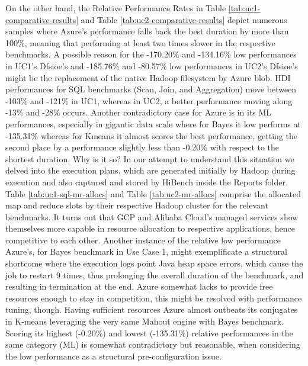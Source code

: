 \documentclass[review]{elsarticle}
\begin{document}
On the other hand, the Relative Performance Rates in Table \ref{tab:uc1-comparative-results} and Table \ref{tab:uc2-comparative-results} depict numerous samples where Azure's performance falls back the best duration by more than 100\%, meaning that performing at least two times slower in the respective benchmarks. A possible reason for the -170.20\% and -134.16\% low performances in UC1's Dfsioe's and -185.76\% and -80.57\% low performances in UC2's Dfsioe's might be the replacement of the native Hadoop filesystem by Azure blob. HDI performances for SQL benchmarks (Scan, Join, and Aggregation) move between -103\% and -121\% in UC1, whereas in UC2, a better performance moving along -13\% and -28\% occurs. Another contradictory case for Azure is in its ML performances, especially in gigantic data scale where for Bayes it low performs at -135.31\% whereas for Kmeans it almost scores the best performance, getting the second place by a performance slightly less than -0.20\% with respect to the shortest duration. Why is it so? In our attempt to understand this situation we delved into the execution plans, which are generated initially by Hadoop during execution and also captured and stored by HiBench inside the Reports folder. Table \ref{tab:uc1-sql-mr-allocs} and Table \ref{tab:uc2-mr-allocs} comprise the allocated map and reduce slots by their respective Hadoop cluster for the relevant benchmarks. It turns out that GCP and Alibaba Cloud's managed services show themselves more capable in resource allocation to respective applications, hence competitive to each other. Another instance of the relative low performance Azure's, for Bayes benchmark in Use Case 1, might exemplificate a structural shortcome where the execution logs point Java heap space errors, which cause the job to restart 9 times, thus prolonging the overall duration of the benchmark, and resulting in termination at the end. Azure somewhat lacks to provide free resources enough to stay in competition, this might be resolved with performance tuning, though. Having sufficient resources Azure almost outbeats its conjugates in K-means leveraging the very same Mahout engine with Bayes benchmark. Scoring its highest (-0.20\%) and lowest (-135.31\%) relative performances in the same category (ML) is somewhat contradictory but reasonable, when considering the low performance as a structural pre-configuration issue.
\end{document}
